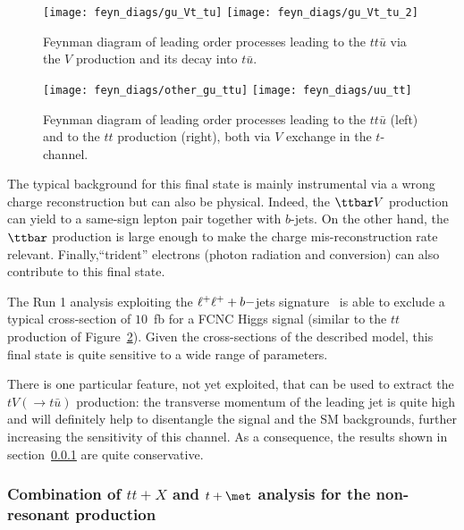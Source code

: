 \begin{figure}[!h!tpd]
\centering
\texttt{[image: feyn\_diags/gu\_Vt\_tu]}  \hspace{1.5cm}
\texttt{[image: feyn\_diags/gu\_Vt\_tu\_2]}
\caption
{
Feynman diagram of leading order processes leading to the $tt\bar{u}$ via the $V$ production and its decay into $t\bar{u}$.
}
\label{fig:feyn_prod_ss_real}
\end{figure}

\begin{figure}[!h!tpd]
\centering
\texttt{[image: feyn\_diags/other\_gu\_ttu]} \hspace{3.5cm}
\texttt{[image: feyn\_diags/uu\_tt]}
\caption
{
Feynman diagram of leading order processes leading to the $tt\bar{u}$ (left) and to the $tt$ production (right), both via $V$ exchange in the $t$-channel.
}
\label{fig:feyn_prod_ss_virt}
\end{figure}

 The typical background for this final state is mainly instrumental via a wrong charge reconstruction but can also be physical. Indeed, the $\ttbarV$ production can yield to a same-sign 
lepton pair together with $b$-jets. On the other hand, the $\ttbar$ production is large enough to make the charge mis-reconstruction rate relevant. Finally,``trident'' electrons 
(photon radiation and conversion) can also contribute to this final state.

The Run 1 analysis exploiting the $\ell^{+}\ell^{+}+b-$jets signature~\cite{ATLASsamesigntop} is able to exclude a 
typical cross-section of $10$~fb for a FCNC Higgs signal (similar to the $tt$ production of Figure~\ref{fig:feyn_prod_ss_virt}). 
Given the cross-sections of the described model, this final state is quite sensitive
to a wide range of parameters.%

There is one particular feature, not yet exploited, that can be used to extract the $tV(\to t\bar{u})$ production: the transverse momentum of the leading jet is quite high 
and will definitely help to disentangle the signal and the SM backgrounds, further increasing the sensitivity of this channel. As a consequence, the results shown
in section~\ref{sec:comb} are quite conservative.

 
 \subsubsection{Combination of $tt+X$ and $t+\met$ analysis for the non-resonant production}
 \label{sec:comb}
 
